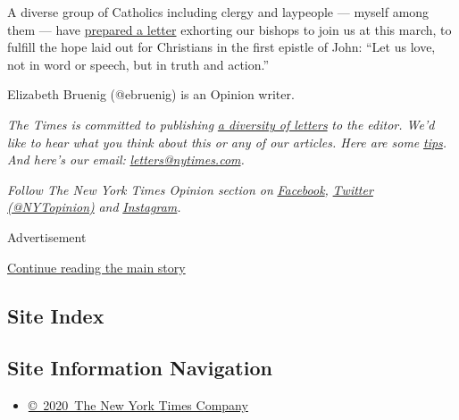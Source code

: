 A diverse group of Catholics including clergy and laypeople --- myself
among them --- have
\href{https://www.catholicsocialaction.com/open_letter_to_all_bishops}{prepared
a letter} exhorting our bishops to join us at this march, to fulfill the
hope laid out for Christians in the first epistle of John: ``Let us
love, not in word or speech, but in truth and action.''

Elizabeth Bruenig (@ebruenig) is an Opinion writer.

\emph{The Times is committed to publishing}
\href{https://www.nytimes.com/2019/01/31/opinion/letters/letters-to-editor-new-york-times-women.html}{\emph{a
diversity of letters}} \emph{to the editor. We'd like to hear what you
think about this or any of our articles. Here are some}
\href{https://help.nytimes.com/hc/en-us/articles/115014925288-How-to-submit-a-letter-to-the-editor}{\emph{tips}}\emph{.
And here's our email:}
\href{mailto:letters@nytimes.com}{\emph{letters@nytimes.com}}\emph{.}

\emph{Follow The New York Times Opinion section on}
\href{https://www.facebook.com/nytopinion}{\emph{Facebook}}\emph{,}
\href{http://twitter.com/NYTOpinion}{\emph{Twitter (@NYTopinion)}}
\emph{and}
\href{https://www.instagram.com/nytopinion/}{\emph{Instagram}}\emph{.}

Advertisement

\protect\hyperlink{after-bottom}{Continue reading the main story}

\hypertarget{site-index}{%
\subsection{Site Index}\label{site-index}}

\hypertarget{site-information-navigation}{%
\subsection{Site Information
Navigation}\label{site-information-navigation}}

\begin{itemize}
\tightlist
\item
  \href{https://help.nytimes.com/hc/en-us/articles/115014792127-Copyright-notice}{©~2020~The
  New York Times Company}
\end{itemize}

